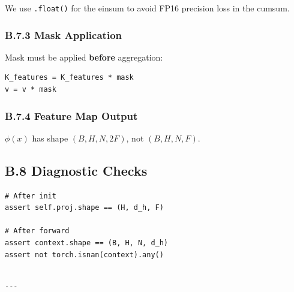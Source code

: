 We use \texttt{.float()} for the einsum to avoid FP16 precision loss in the 
cumsum.

\subsubsection{B.7.3 Mask Application}

Mask must be applied \textbf{before} aggregation:

\begin{lstlisting}
K_features = K_features * mask
v = v * mask
\end{lstlisting}

\subsubsection{B.7.4 Feature Map Output}

$\phi(x)$ has shape $(B, H, N, 2F)$, not $(B, H, N, F)$.

\subsection{B.8 Diagnostic Checks}

\begin{lstlisting}
# After init
assert self.proj.shape == (H, d_h, F)

# After forward
assert context.shape == (B, H, N, d_h)
assert not torch.isnan(context).any()
\end{lstlisting}
\begin{lstlisting}

---
\end{lstlisting}
